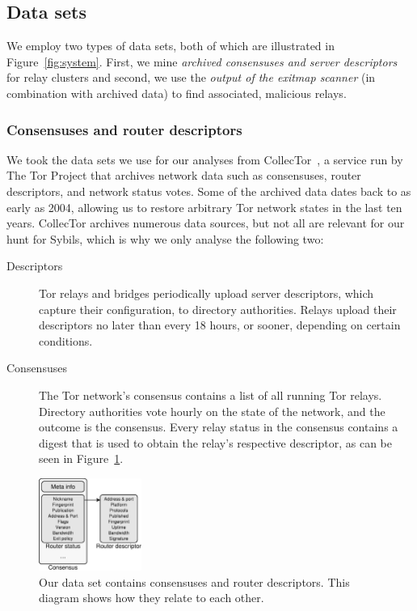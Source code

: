 
\subsection{Data sets}
\label{sec:datasets}
We employ two types of data sets, both of which are illustrated in
Figure~\ref{fig:system}.  First, we mine \emph{archived consensuses and server
descriptors} for relay clusters and second, we use the \emph{output of the
exitmap scanner} (in combination with archived data) to find associated,
malicious relays.

\subsubsection{Consensuses and router descriptors}
We took the data sets we use for our analyses from CollecTor~\cite{collector},
a service run by The Tor Project that archives network data such as
consensuses, router descriptors, and network status votes.  Some of the
archived data dates back to as early as 2004, allowing us to restore arbitrary
Tor network states in the last ten years.  CollecTor archives numerous data
sources, but not all are relevant for our hunt for Sybils, which is why we only
analyse the following two:

\begin{description}
	\item[Descriptors] Tor relays and bridges periodically upload server
		descriptors, which capture their configuration, to directory
		authorities.  Relays upload their descriptors no later than every 18
		hours, or sooner, depending on certain conditions.

	\item[Consensuses] The Tor network's consensus contains a list of all
		running Tor relays.  Directory authorities vote hourly on the state of
		the network, and the outcome is the consensus.  Every relay status in
		the consensus contains a digest that is used to obtain the relay's
		respective descriptor, as can be seen in Figure~\ref{fig:datasets}.
\end{description}

\begin{figure}[t]
	\centering
	\includegraphics[width=0.3\textwidth]{diagrams/data_sets.pdf}
	\caption{Our data set contains consensuses and router descriptors.  This
		diagram shows how they relate to each other.}
	\label{fig:datasets}
\end{figure}

